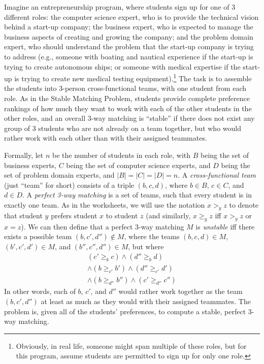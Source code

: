\documentclass[11pt]{article}
\begin{document}
Imagine an entrepreneurship program,
where students sign up for one of 3 different roles:
the computer science expert, who is to provide the technical vision
behind a start-up company;
the business expert, who is expected to manage the business aspects
of creating and growing the company;
and the problem domain expert, who should understand the problem that
the start-up company is trying to address (e.g., someone with boating
and nautical experience if the start-up is trying to create autonomous
ships; or someone with medical expertise if the start-up is trying to
create new medical testing equipment).\footnote{
Obviously, in real life, someone might span multiple of these roles,
but for this program, assume students are permitted to sign up for
only one role.}
The task is to assemble the students into 3-person
cross-functional teams, with one student from each role.  As in the
Stable Matching Problem, students provide complete preference
rankings of how much they want to work with each of the other students
in the other roles, and an overall 3-way matching is ``stable'' if
there does not exist any group of 3 students who are not already on
a team together, but who would rather work with each other than
with their assigned teammates.

Formally, let $n$ be the number of students in each role,
with
$B$ being the set of business experts,
$C$ being the set of computer science experts,
and $D$ being the set of problem domain experts,
and $|B|=|C|=|D|=n$.
A \textit{cross-functional team} (just ``team'' for short) consists of a
triple $(b,c,d)$, where $b\in B$, $c\in C$, and $d\in D$.
A \textit{perfect 3-way matching} is a set of teams, such that every student is
in exactly one team.
As in the worksheets, we will use the notation $x >_y z$ to denote
that student $y$ prefers student $x$ to student $z$ (and similarly,
$x \ge_y z$ iff $x >_y z$ or $x=z$).
We can then define that a perfect 3-way matching $M$ is \textit{unstable} iff
there exists a possible team $(b,c',d'')\not\in M$,
where the teams $(b,c,d)\in M$, $(b',c',d')\in M$, and $(b'',c'',d'')\in M$,
but where
\begin{eqnarray*}
( c' \ge_b c ) \wedge (d'' \ge_b d) \\
\wedge ( b \ge_{c'} b' ) \wedge (d'' \ge_{c'} d') \\
\wedge ( b \ge_{d''} b'' ) \wedge (c' \ge_{d''} c'')
\end{eqnarray*}
In other words, each of $b$, $c'$, and $d''$ would rather work
together as the team $(b,c',d'')$
at least as much as they would with their assigned teammates.
The problem is, given all of the students' preferences, to compute
a stable, perfect 3-way matching.
\end{document}
